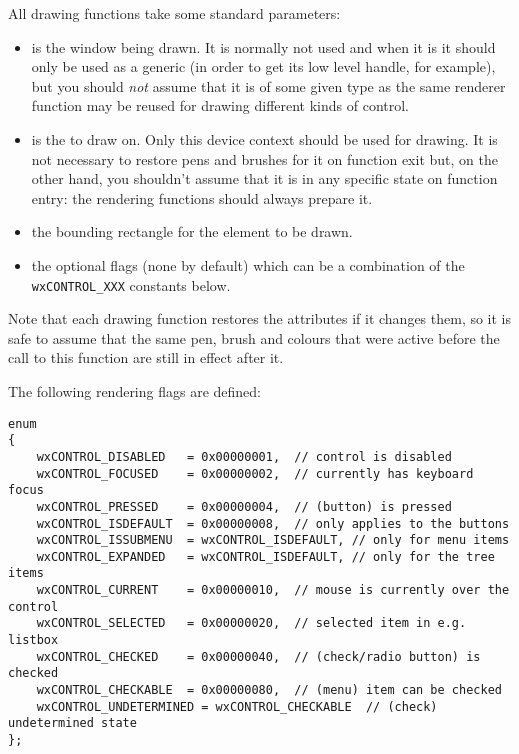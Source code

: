 All drawing functions take some standard parameters:
\begin{itemize}
\item {} is the window being drawn. It is normally not used and when
it is it should only be used as a generic  
(in order to get its low level handle, for example), but you should
\emph{not} assume that it is of some given type as the same renderer
function may be reused for drawing different kinds of control.
\item {} is the  to draw on. Only this device
context should be used for drawing. It is not necessary to restore
pens and brushes for it on function exit but, on the other hand, you
shouldn't assume that it is in any specific state on function entry:
the rendering functions should always prepare it.
\item {} the bounding rectangle for the element to be drawn.
\item {} the optional flags (none by default) which can be a
combination of the \texttt{wxCONTROL\_XXX} constants below.
\end{itemize}

Note that each drawing function restores the  attributes if
it changes them, so it is safe to assume that the same pen, brush and colours
that were active before the call to this function are still in effect after it.



The following rendering flags are defined:

\begin{verbatim}
enum
{
    wxCONTROL_DISABLED   = 0x00000001,  // control is disabled
    wxCONTROL_FOCUSED    = 0x00000002,  // currently has keyboard focus
    wxCONTROL_PRESSED    = 0x00000004,  // (button) is pressed
    wxCONTROL_ISDEFAULT  = 0x00000008,  // only applies to the buttons
    wxCONTROL_ISSUBMENU  = wxCONTROL_ISDEFAULT, // only for menu items
    wxCONTROL_EXPANDED   = wxCONTROL_ISDEFAULT, // only for the tree items
    wxCONTROL_CURRENT    = 0x00000010,  // mouse is currently over the control
    wxCONTROL_SELECTED   = 0x00000020,  // selected item in e.g. listbox
    wxCONTROL_CHECKED    = 0x00000040,  // (check/radio button) is checked
    wxCONTROL_CHECKABLE  = 0x00000080,  // (menu) item can be checked
    wxCONTROL_UNDETERMINED = wxCONTROL_CHECKABLE  // (check) undetermined state
};
\end{verbatim}

